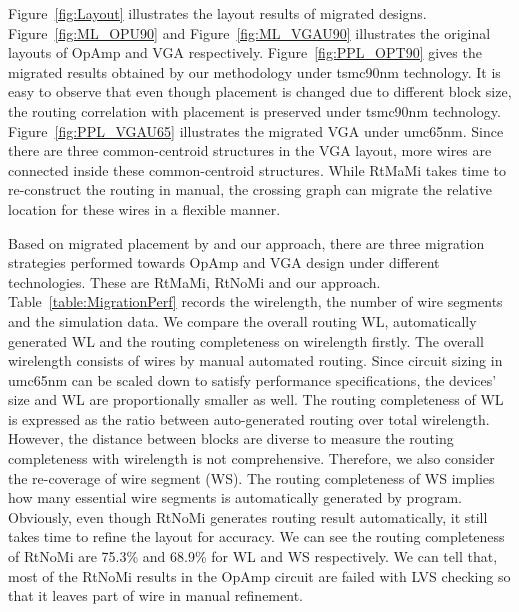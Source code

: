     Figure~\ref{fig:Layout} illustrates the layout results of migrated designs. Figure~\ref{fig:ML_OPU90} and Figure~\ref{fig:ML_VGAU90} illustrates the original layouts of OpAmp and VGA respectively. Figure~\ref{fig:PPL_OPT90} gives the migrated results obtained by our methodology under tsmc90nm technology. It is easy to observe that even though placement is changed due to different block size, the routing correlation with placement is preserved under tsmc90nm technology. Figure~\ref{fig:PPL_VGAU65} illustrates the migrated VGA under umc65nm. Since there are three common-centroid structures in the VGA layout, more wires are connected inside these common-centroid structures. While RtMaMi takes time to re-construct the routing in manual, the crossing graph can migrate the relative location for these wires in a flexible manner.


    Based on migrated placement by \cite{msc-bhattacharya-tcad06} and our approach, there are three migration strategies performed towards OpAmp and VGA design under different technologies. These are RtMaMi, RtNoMi and our approach. Table~\ref{table:MigrationPerf} records the wirelength, the number of wire segments and the simulation data. We compare the overall routing WL, automatically generated WL and the routing completeness on wirelength firstly. The overall wirelength consists of wires by manual automated routing. Since circuit sizing in umc65nm can be scaled down to satisfy performance specifications, the devices' size and WL are proportionally smaller as well. The routing completeness of WL is expressed as the ratio between auto-generated routing over total wirelength. However, the distance between blocks are diverse to measure the routing completeness with wirelength is not comprehensive. Therefore, we also consider the re-coverage of wire segment (WS). The routing completeness of WS implies how many essential wire segments is automatically generated by program. Obviously, even though RtNoMi generates routing result automatically, it still takes time to refine the layout for accuracy. We can see the routing completeness of RtNoMi are 75.3\% and 68.9\% for WL and WS respectively. We can tell that, most of the RtNoMi results in the OpAmp circuit are failed with LVS checking so that it leaves part of wire in manual refinement.

